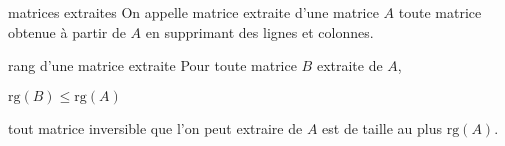 \begin{adjustwidth}{-3cm}{-3cm}
\begin{definition}{25.50}{matrices extraites}
    On appelle matrice extraite d'une matrice $A$ toute matrice obtenue à partir de $A$ en supprimant des lignes et colonnes.
\end{definition}

\begin{proposition}{25.52}{rang d'une matrice extraite}
    Pour toute matrice $B$ extraite de $A$, 
    \begin{enumeratebf}
        \item $\text{rg}(B) \leq \text{rg}(A)$
        \item tout matrice inversible que l'on peut extraire de $A$ est de taille au plus $\text{rg}(A)$.
    \end{enumeratebf}
\end{proposition}



\end{adjustwidth}
